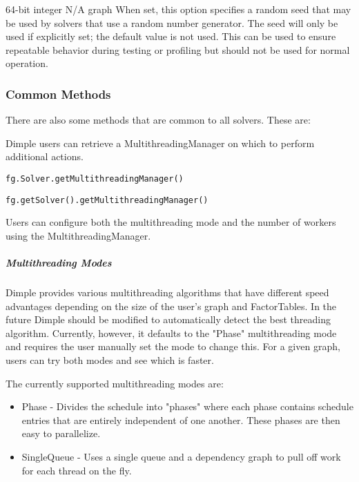 
{64-bit integer}
{N/A}
{graph}
{When set, this option specifies a random seed that may be used by solvers that use a random number generator. The seed will only be used if explicitly set; the default value is not used. This can be used to ensure repeatable behavior during testing or profiling but should not be used for normal operation.}

\subsubsection{Common Methods}

There are also some methods that are common to all solvers. These are:


Dimple users can retrieve a MultithreadingManager on which to perform additional actions.

\ifmatlab
\begin{lstlisting}
fg.Solver.getMultithreadingManager()
\end{lstlisting}
\fi

\ifjava
\begin{lstlisting}
fg.getSolver().getMultithreadingManager()
\end{lstlisting}
\fi

Users can configure both the multithreading mode and the number of workers using the MultithreadingManager.

\subparagraph{Multithreading Modes}

Dimple provides various multithreading algorithms that have different speed advantages depending on the size of the user's graph and FactorTables.  In the future Dimple should be modified to automatically detect the best threading algorithm.  Currently, however, it defaults to the "Phase" multithreading mode and requires the user manually set the mode to change this.  For a given graph, users can try both modes and see which is faster.

The currently supported multithreading modes are:

\begin{itemize}
\item Phase - Divides the schedule into "phases" where each phase contains schedule entries that are entirely independent of one another.  These phases are then easy to parallelize.  
\item SingleQueue - Uses a single queue and a dependency graph to pull off work for each thread on the fly.  
\end{itemize}


